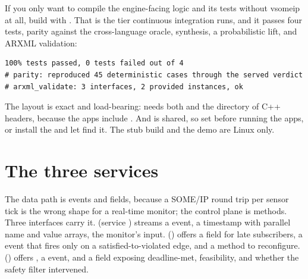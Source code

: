 If you only want to compile the engine-facing logic and its tests without vsomeip at all, build with . That is the tier continuous integration runs, and it passes four tests, parity against the cross-language oracle, synthesis, a probabilistic lift, and ARXML validation:

\begin{lstlisting}
100% tests passed, 0 tests failed out of 4
# parity: reproduced 45 deterministic cases through the served verdict
# arxml_validate: 3 interfaces, 2 provided instances, ok
\end{lstlisting}

\begin{pitfall}
The  layout is exact and load-bearing:  needs both  and the  directory of C++ headers, because the apps include . And  is shared, so set  before running the apps, or install the  and let  find it. The stub build and the demo are Linux only.
\end{pitfall}

\section{The three services}

The data path is events and fields, because a SOME/IP round trip per sensor tick is the wrong shape for a real-time monitor; the control plane is methods. Three interfaces carry it.  (service ) streams a  event, a timestamp with parallel name and value arrays, the monitor's input.  () offers a  field for late subscribers, a  event that fires only on a satisfied-to-violated edge, and a  method to reconfigure.  () offers , a  event, and a  field exposing deadline-met, feasibility, and whether the safety filter intervened.

